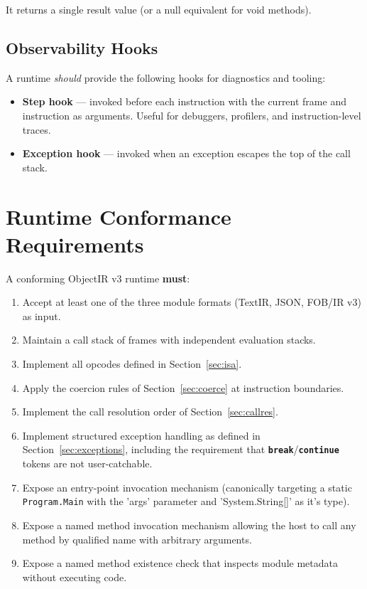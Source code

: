\documentclass[11pt,a4paper]{article}
\newcommand{\opcode}[1]{\textbf{\texttt{#1}}}
\begin{document}
It returns a single result value (or a null equivalent for void methods).

\subsection{Observability Hooks}

A runtime \textit{should} provide the following hooks for diagnostics and
tooling:

\begin{itemize}[leftmargin=1.8em]
  \item \textbf{Step hook} --- invoked before each instruction with the
    current frame and instruction as arguments. Useful for debuggers,
    profilers, and instruction-level traces.
  \item \textbf{Exception hook} --- invoked when an exception escapes the
    top of the call stack.
\end{itemize}

\section{Runtime Conformance Requirements}
\label{sec:conformance}


A conforming ObjectIR v3 runtime \textbf{must}:

\begin{enumerate}[leftmargin=2em]
	\item Accept at least one of the three module formats
	(TextIR, JSON, FOB/IR v3) as input.
	\item Maintain a call stack of frames with independent evaluation stacks.
	\item Implement all opcodes defined in Section~\ref{sec:isa}.
	\item Apply the coercion rules of Section~\ref{sec:coerce} at instruction
	boundaries.
	\item Implement the call resolution order of Section~\ref{sec:callres}.
	\item Implement structured exception handling as defined in
	Section~\ref{sec:exceptions}, including the requirement that
	\opcode{break}/\opcode{continue} tokens are not user-catchable.
	\item Expose an entry-point invocation mechanism (canonically targeting a
	static \texttt{Program.Main} with the 'args' parameter and 'System.String[]' as it's type).
	\item Expose a named method invocation mechanism allowing the host to call
	any method by qualified name with arbitrary arguments.
	\item Expose a named method existence check that inspects module metadata
	without executing code.
\end{enumerate}
\end{document}
